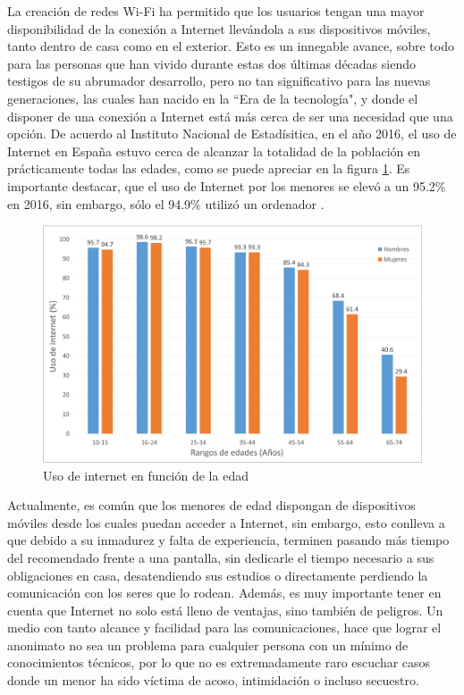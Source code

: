 \documentclass[12pt]{article}
\begin{document}
La creación de redes Wi-Fi ha permitido que los usuarios tengan una mayor disponibilidad de la conexión a Internet llevándola a sus dispositivos móviles, tanto dentro de casa como en el exterior. Esto es un innegable avance, sobre todo para las personas que han vivido durante estas dos últimas décadas siendo testigos de su abrumador desarrollo, pero no tan significativo para las nuevas generaciones, las cuales han nacido en la ``Era de la tecnología", y donde el disponer de una conexión a Internet está más cerca de ser una necesidad que una opción. De acuerdo al Instituto Nacional de Estadísitica, en el año 2016, el uso de Internet en España estuvo cerca de alcanzar la totalidad de la población en prácticamente todas las edades, como se puede apreciar en la figura \ref{fig:internet_ages}. Es importante destacar, que el uso de Internet por los menores se elevó a un 95.2\% en 2016, sin embargo, sólo el 94.9\% utilizó un ordenador \cite{EncuestaTIC}.

\begin{figure}[h!]
    \centering
        \includegraphics[scale=0.5]{internet_ages.eps}
        \caption{Uso de internet en función de la edad}
        \label{fig:internet_ages}
\end{figure}

Actualmente, es común que los menores de edad dispongan de dispositivos móviles desde los cuales puedan acceder a Internet, sin embargo, esto conlleva a que debido a su inmadurez y falta de experiencia, terminen pasando más tiempo del recomendado frente a una pantalla, sin dedicarle el tiempo necesario a sus obligaciones en casa, desatendiendo sus estudios o directamente perdiendo la comunicación con los seres que lo rodean. Además, es muy importante tener en cuenta que Internet no solo está lleno de ventajas, sino también de peligros. Un medio con tanto alcance y facilidad para las comunicaciones, hace que lograr el anonimato no sea un problema para cualquier persona con un mínimo de conocimientos técnicos, por lo que no es extremadamente raro escuchar casos donde un menor ha sido víctima de acoso, intimidación o incluso secuestro.
\end{document}
